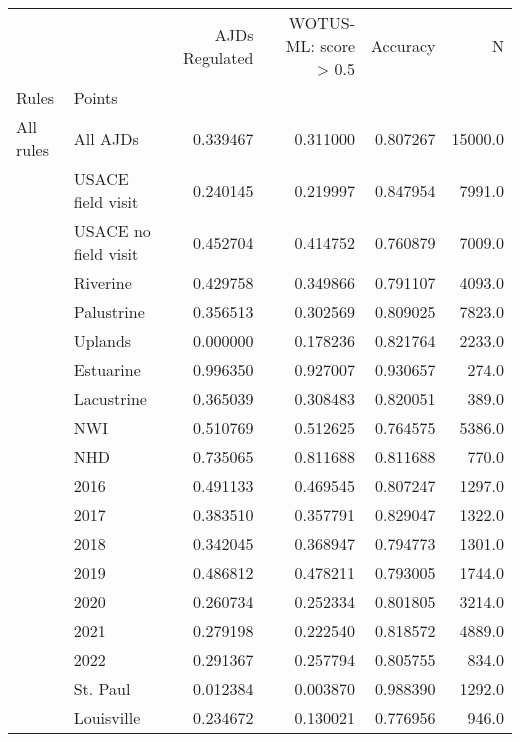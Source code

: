\begin{tabular}{llrrrr}
\toprule
     &             &  AJDs Regulated &  WOTUS-ML: score > 0.5 &  Accuracy &        N \\
Rules & Points &                 &                        &           &          \\
\midrule
All rules & All AJDs &        0.339467 &               0.311000 &  0.807267 &  15000.0 \\
     & USACE field visit &        0.240145 &               0.219997 &  0.847954 &   7991.0 \\
     & USACE no field visit &        0.452704 &               0.414752 &  0.760879 &   7009.0 \\
     & Riverine &        0.429758 &               0.349866 &  0.791107 &   4093.0 \\
     & Palustrine &        0.356513 &               0.302569 &  0.809025 &   7823.0 \\
     & Uplands &        0.000000 &               0.178236 &  0.821764 &   2233.0 \\
     & Estuarine &        0.996350 &               0.927007 &  0.930657 &    274.0 \\
     & Lacustrine &        0.365039 &               0.308483 &  0.820051 &    389.0 \\
     & NWI &        0.510769 &               0.512625 &  0.764575 &   5386.0 \\
     & NHD &        0.735065 &               0.811688 &  0.811688 &    770.0 \\
     & 2016 &        0.491133 &               0.469545 &  0.807247 &   1297.0 \\
     & 2017 &        0.383510 &               0.357791 &  0.829047 &   1322.0 \\
     & 2018 &        0.342045 &               0.368947 &  0.794773 &   1301.0 \\
     & 2019 &        0.486812 &               0.478211 &  0.793005 &   1744.0 \\
     & 2020 &        0.260734 &               0.252334 &  0.801805 &   3214.0 \\
     & 2021 &        0.279198 &               0.222540 &  0.818572 &   4889.0 \\
     & 2022 &        0.291367 &               0.257794 &  0.805755 &    834.0 \\
     & St. Paul &        0.012384 &               0.003870 &  0.988390 &   1292.0 \\
     & Louisville &        0.234672 &               0.130021 &  0.776956 &    946.0 \\

\end{tabular}
